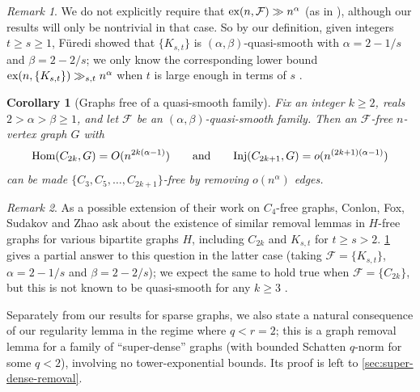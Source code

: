 \documentclass[reqno,11pt]{amsart}
\newtheorem{corollary}[theorem]{Corollary}
\theoremstyle{definition}
\theoremstyle{remark}
\newtheorem*{remark}{Remark}
\numberwithin{equation}{section}
\newcommand{\mF}{\mathcal{F}}
\newcommand{\ex}{\textnormal{ex}}
\newcommand{\Hom}{\textnormal{Hom}}
\newcommand{\Inj}{\textnormal{Inj}}
\begin{document}
\begin{remark}
We do not explicitly require that $\ex(n, \mF) \gg n^\alpha$ (as in \cite{jiang2021bipartite}), although our results will only be nontrivial in that case.
So by our definition, given integers $t \ge s \ge 1$, F\"uredi \cite{furedi1996upper} showed that $\{K_{s,t}\}$ is $(\alpha, \beta)$-quasi-smooth with $\alpha = 2 - 1/s$ and $\beta = 2 - 2/s$; we only know the corresponding lower bound $\ex(n, \{K_{s,t}\}) \gg_{s,t} n^\alpha$ when $t$ is large enough in terms of $s$ \cite{alon1999norm}. %
\end{remark}

\begin{corollary}[Graphs free of a quasi-smooth family] \label{cor:smooth-free-graphs}
Fix an integer $k \ge 2$,  
reals $2 > \alpha > \beta \ge 1$, and let $\mF$ be an $(\alpha, \beta)$-quasi-smooth family. Then an $\mF$-free $n$-vertex graph $G$ with 
\[
    \Hom(C_{2k}, G) = O(n^{2k(\alpha - 1)})
    \qquad 
    \text{and} 
    \qquad 
    \Inj(C_{2k+1}, G) = o(n^{(2k+1)(\alpha - 1)})
\]
can be made $\{C_3, C_5, \ldots, C_{2k+1}\}$-free by removing $o(n^\alpha)$ edges.
\end{corollary}

\begin{remark}
As a possible extension of their work on $C_4$-free graphs, Conlon, Fox, Sudakov and Zhao ask \cite{conlon2021graphs} about the existence of similar removal lemmas in $H$-free graphs for various bipartite graphs $H$, including $C_{2k}$ and $K_{s,t}$ for $t \ge s > 2$. \cref{cor:smooth-free-graphs} gives a partial answer to this question in the latter case (taking $\mF = \{K_{s,t}\}$, $\alpha = 2 - 1/s$ and $\beta = 2 - 2/s$); we expect the same to hold true when $\mF = \{C_{2k}\}$, but this is not known to be quasi-smooth for any $k \ge 3$ \cite{jiang2021bipartite,allen2014turan}.
\end{remark}



Separately from our results for sparse graphs, we also state a natural consequence of our regularity lemma in the regime where $q < r = 2$; this is a graph removal lemma for a family of ``super-dense'' graphs (with bounded Schatten $q$-norm for some $q < 2$), involving no tower-exponential bounds. Its proof is left to \cref{sec:super-dense-removal}.
\end{document}
